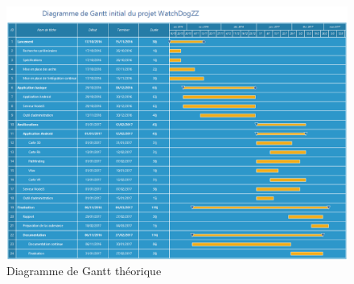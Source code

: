 \newpage
\begin{landscape}
\begin{figure}[h]
    \centering
    \includegraphics[height=\textwidth]{../gantt_initial.png}
    \caption{Diagramme de Gantt théorique}
\end{figure}
\end{landscape}

